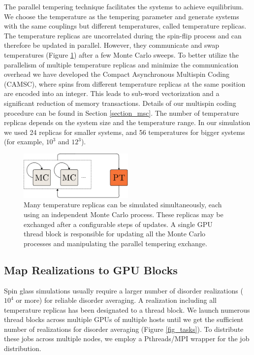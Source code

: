 The parallel tempering technique facilitates the systems to achieve 
equilibrium. We choose the temperature as the tempering parameter and generate systems 
with the same couplings but different temperatures, called temperature replicas. The 
temperature replicas are uncorrelated during the spin-flip process and can therefore
be updated in parallel. However, they communicate and 
swap temperatures (Figure \ref{fig_bits}) after a few Monte Carlo sweeps. To better 
utilize the parallelism of multiple temperature replicas and minimize the communication 
overhead we have developed the Compact Asynchronous Multispin Coding (CAMSC), where 
spins from different temperature replicas at the same position are encoded into 
an integer. This leads to sub-word vectorization and a significant reduction of 
memory transactions. Details of our multispin coding procedure can be found in 
Section \ref{section_msc}. The number of temperature replicas depends on the 
system size and the temperature range. In our simulation we used 24 replicas 
for smaller systems, and 56 temperatures for bigger systems (for example, 
$10^3$ and $12^3$).  


\begin{figure}[ht]
  \centering
  \includegraphics[width=0.5\textwidth] {img/skeleton4_.pdf}
  \caption{Many temperature replicas can be simulated simultaneously, each 
using an independent Monte Carlo process. These replicas may be exchanged
after a configurable steps of updates. 
A single GPU thread block is responsible for updating all the Monte Carlo processes
and manipulating the parallel tempering exchange.
}
 \label{fig_bits}
  \end{figure}


\subsection{Map Realizations to GPU Blocks}


Spin glass simulations usually require a larger number of disorder realizations ($10^4$ or more) for reliable 
disorder averaging.  A realization including all temperature replicas has been designated to 
a thread block.  We launch numerous thread blocks across multiple GPUs of multiple hosts 
until we get the sufficient number of realizations for disorder averaging (Figure \ref{fig_tasks}). To distribute 
these jobs across multiple nodes, we employ a Pthreads/MPI wrapper for the job distribution. 

